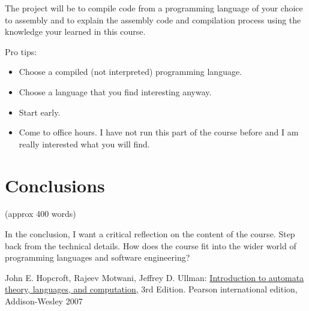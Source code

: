 \documentclass{article}
\theoremstyle{theorem}
\theoremstyle{definition}
\theoremstyle{remark}
\begin{document}
The project will be to compile code from a programming language of your choice to assembly and to explain the assembly code and compilation process using the knowledge your learned in this course. 


\medskip\noindent
Pro tips:
\begin{itemize}
\item Choose a compiled (not interpreted) programming language.
\item Choose a language that you find interesting anyway.
\item Start early.
\item Come to office hours. I have not run this part of the course before and I am really interested what you will find.
\end{itemize}
 
\section{Conclusions}\label{conclusions}

(approx 400 words)

In the conclusion, I want a critical reflection on the content of the course. Step back from the technical details. How does the course fit into the wider world of programming languages and software engineering?

\begin{thebibliography}{99}
	John E. Hopcroft, Rajeev Motwani, Jeffrey D. Ullman:
\href{http://ce.sharif.edu/courses/94-95/1/ce414-2/resources/root/Text\%20Books/Automata/John\%20E.\%20Hopcroft,\%20Rajeev\%20Motwani,\%20Jeffrey\%20D.\%20Ullman-Introduction\%20to\%20Automata\%20Theory,\%20Languages,\%20and\%20Computations-Prentice\%20Hall\%20(2006).pdf}{Introduction to automata theory, languages, and computation,} 3rd Edition. Pearson international edition, Addison-Wesley 2007

\end{thebibliography}
\end{document}
